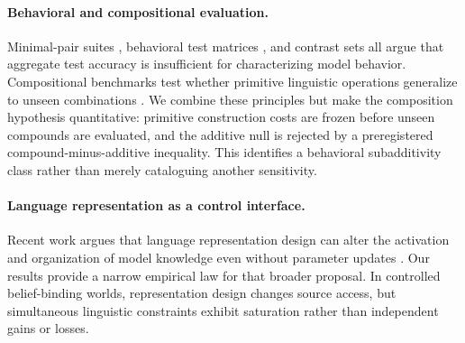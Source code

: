 \paragraph{Behavioral and compositional evaluation.}
Minimal-pair suites \citep{warstadt-etal-2020-blimp-benchmark}, behavioral test
matrices \citep{ribeiro-etal-2020-beyond}, and contrast sets
\citep{gardner-etal-2020-evaluating} all argue that aggregate test accuracy is
insufficient for characterizing model behavior. Compositional benchmarks test
whether primitive linguistic operations generalize to unseen combinations
\citep{kim-linzen-2020-cogs}. We combine these principles but make the
composition hypothesis quantitative: primitive construction costs are frozen
before unseen compounds are evaluated, and the additive null is rejected by a
preregistered compound-minus-additive inequality. This identifies a behavioral
subadditivity class rather than merely cataloguing another sensitivity.

\paragraph{Language representation as a control interface.}
Recent work argues that language representation design can alter the activation
and organization of model knowledge even without parameter updates
\citep{yang2026schema}. Our results provide a narrow empirical law for that
broader proposal. In controlled belief-binding worlds, representation design
changes source access, but simultaneous linguistic constraints exhibit
saturation rather than independent gains or losses.
